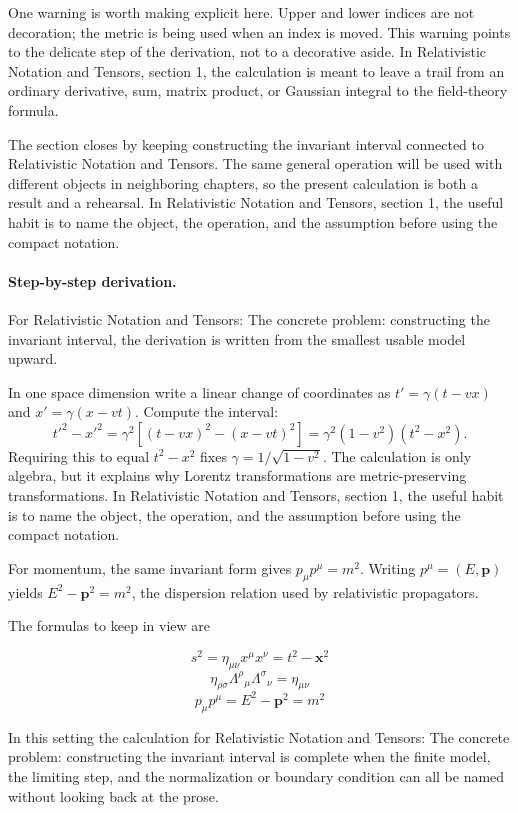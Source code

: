 One warning is worth making explicit here.  Upper and lower indices are not decoration; the metric is being used when an index is moved.  This warning points to the delicate step of the derivation, not to a decorative aside.  In Relativistic Notation and Tensors, section 1, the calculation is meant to leave a trail from an ordinary derivative, sum, matrix product, or Gaussian integral to the field-theory formula.

The section closes by keeping constructing the invariant interval connected to Relativistic Notation and Tensors.  The same general operation will be used with different objects in neighboring chapters, so the present calculation is both a result and a rehearsal.  In Relativistic Notation and Tensors, section 1, the useful habit is to name the object, the operation, and the assumption before using the compact notation.



\paragraph{Step-by-step derivation.}

For Relativistic Notation and Tensors: The concrete problem: constructing the invariant interval, the derivation is written from the smallest usable model upward.

In one space dimension write a linear change of coordinates as \(t'=\gamma(t-vx)\) and \(x'=\gamma(x-vt)\).  Compute the interval:
\[
  t'^2-x'^2
  =
  \gamma^2[(t-vx)^2-(x-vt)^2]
  =
  \gamma^2(1-v^2)(t^2-x^2).
\]
Requiring this to equal \(t^2-x^2\) fixes \(\gamma=1/\sqrt{1-v^2}\).  The calculation is only algebra, but it explains why Lorentz transformations are metric-preserving transformations.  In Relativistic Notation and Tensors, section 1, the useful habit is to name the object, the operation, and the assumption before using the compact notation.

For momentum, the same invariant form gives \(p_\mu p^\mu=m^2\).  Writing \(p^\mu=(E,\bm p)\) yields \(E^2-\bm p^2=m^2\), the dispersion relation used by relativistic propagators.

The formulas to keep in view are

\[
  s^2=\eta_{\mu\nu}x^\mu x^\nu=t^2-\bm x^2
\]
\[
  \eta_{\rho\sigma}\Lambda^\rho{}_\mu\Lambda^\sigma{}_\nu=\eta_{\mu\nu}
\]
\[
  p_\mu p^\mu=E^2-\bm p^2=m^2
\]

In this setting the calculation for Relativistic Notation and Tensors: The concrete problem: constructing the invariant interval is complete when the finite model, the limiting step, and the normalization or boundary condition can all be named without looking back at the prose.




